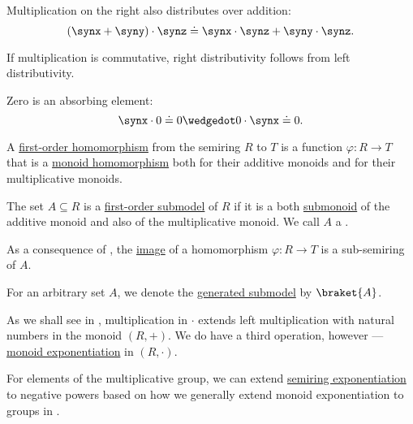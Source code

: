 \begin{definition}
\begin{thmenum}
\begin{thmenum}
       Multiplication on the right also distributes over addition:
      \begin{equation}\label{eq:def:semiring/right_distributivity}
        (\synx + \syny) \cdot \synz \syneq \synx \cdot \synz + \syny \cdot \synz.
      \end{equation}

      If multiplication is commutative, right distributivity follows from left distributivity.

       Zero is an absorbing element:
      \begin{equation}\label{eq:def:semiring/absorption}
        \synx \cdot 0 \syneq 0 \synwedge 0 \cdot \synx \syneq 0.
      \end{equation}
    \end{thmenum}

     A \hyperref[def:first_order_homomorphism]{first-order homomorphism} from the semiring \( R \) to \( T \) is a function \( \varphi: R \to T \) that is a \hyperref[def:monoid/homomorphism]{monoid homomorphism} both for their additive monoids and for their multiplicative monoids.

     The set \( A \subseteq R \) is a \hyperref[def:first_order_submodel]{first-order submodel} of \( R \) if it is a both \hyperref[def:monoid/submodel]{submonoid} of the additive monoid and also of the multiplicative monoid. We call \( A \) a .

    As a consequence of , the \hyperref[def:set_valued_map/image]{image} of a homomorphism \( \varphi: R \to T \) is a sub-semiring of \( A \).

    \mimprovised For an arbitrary set \( A \), we denote the \hyperref[def:first_order_generated_substructure]{generated submodel} by \( \braket{ A } \).

     As we shall see in , multiplication in \( \cdot \) extends left multiplication with natural numbers in the monoid \( (R, +) \). We do have a third operation, however --- \hyperref[def:monoid/exponentiation]{monoid exponentiation} in \( (R, \cdot) \).

    For elements of the multiplicative group, we can extend \hyperref[def:semiring/exponentiation]{semiring exponentiation} to negative powers based on how we generally extend monoid exponentiation to groups in .


\end{thmenum}
\end{definition}

